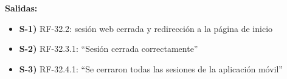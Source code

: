 \textbf{Salidas:}
\begin{itemize}[label={}, leftmargin=1.5em]
  \item \textbf{S-1)} RF-32.2: sesi\'on web cerrada y redirecci\'on a la p\'agina de inicio
  \item \textbf{S-2)} RF-32.3.1: ``Sesi\'on cerrada correctamente''
  \item \textbf{S-3)} RF-32.4.1: ``Se cerraron todas las sesiones de la aplicaci\'on m\'ovil''
\end{itemize}
